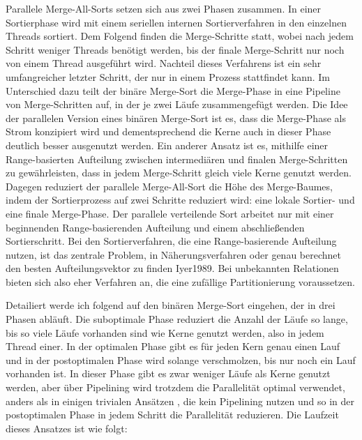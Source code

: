\documentclass[a4paper,12pt,twoside]{article}
\begin{document}
Parallele Merge-All-Sorts {\autocite[S. 831f]{Taniar2000}} setzen sich aus zwei Phasen zusammen. In einer Sortierphase wird mit einem seriellen internen Sortierverfahren in den einzelnen Threads sortiert. Dem Folgend finden die Merge-Schritte statt, wobei nach jedem Schritt weniger Threads benötigt werden, bis der finale Merge-Schritt nur noch von einem Thread ausgeführt wird. Nachteil dieses Verfahrens ist ein sehr umfangreicher letzter Schritt, der nur in einem Prozess stattfindet kann. Im Unterschied dazu teilt der binäre Merge-Sort {\autocite[S. 832f]{Taniar2000}} die Merge-Phase in eine Pipeline von Merge-Schritten auf, in der je zwei Läufe zusammengefügt werden. Die Idee der parallelen Version eines binären Merge-Sort {\autocite[S. 833]{Taniar2000}} ist es, dass die Merge-Phase als Strom konzipiert wird und dementsprechend die Kerne auch in dieser Phase deutlich besser ausgenutzt werden. Ein anderer Ansatz ist es, mithilfe einer Range-basierten Aufteilung zwischen intermediären und finalen Merge-Schritten zu gewährleisten, dass in jedem Merge-Schritt gleich viele Kerne genutzt werden. Dagegen reduziert der parallele Merge-All-Sort {\autocite[S. 833f]{Taniar2000}} die Höhe des Merge-Baumes, indem der Sortierprozess auf zwei Schritte reduziert wird: eine lokale Sortier- und eine finale Merge-Phase. Der parallele verteilende Sort arbeitet nur mit einer beginnenden Range-basierenden Aufteilung und einem abschließenden Sortierschritt. Bei den Sortierverfahren, die eine Range-basierende Aufteilung nutzen, ist das zentrale Problem, in Näherungsverfahren oder genau berechnet den besten Aufteilungsvektor zu finden {\autocite{Lu1994}{Iyer1989}}. Bei unbekannten Relationen bieten sich also eher Verfahren an, die eine zufällige Partitionierung voraussetzen.

Detailiert werde ich {\textcite[S. 333ff]{Bitton1983}} folgend auf den binären Merge-Sort eingehen, der in drei Phasen abläuft. Die suboptimale Phase reduziert die Anzahl der Läufe so lange, bis so viele Läufe vorhanden sind wie Kerne genutzt werden, also in jedem Thread einer. In der optimalen Phase gibt es für jeden Kern genau einen Lauf und in der postoptimalen Phase wird solange verschmolzen, bis nur noch ein Lauf vorhanden ist. In dieser Phase gibt es zwar weniger Läufe als Kerne genutzt werden, aber über Pipelining wird trotzdem die Parallelität optimal verwendet, anders als in einigen trivialen Ansätzen {\autocite{Yu1998}}, die kein Pipelining nutzen und so in der postoptimalen Phase in jedem Schritt die Parallelität reduzieren. Die Laufzeit dieses Ansatzes ist wie folgt:
\end{document}

